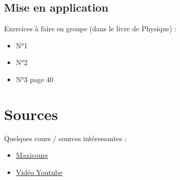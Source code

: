 \documentclass{article}
\begin{document}
\subsection{Mise en application}

\begin{tcolorbox}[colback=blue!10!white, colframe=blue!75!black, title=Application : Structure électronique]
  Exercices à faire en groupe (dans le livre de Physique) : 
  \begin{itemize}[noitemsep]
    \item N°1
    \item N°2
    \item N°3 page 40
  \end{itemize}
\end{tcolorbox}





\section{Sources}

Quelques cours / sources intéressantes : 

\begin{itemize}[noitemsep]
  \item \href{https://www.maxicours.com/se/cours/etablir-le-schema-de-lewis-et-la-geometrie-d-une-molecule/}{Maxicours}
  \item \href{https://www.youtube.com/watch?v=bmV-Tbv2Me8&ab_channel=e-profs-PhysiqueChimie}{Vidéo Youtube}
\end{itemize}
\end{document}
